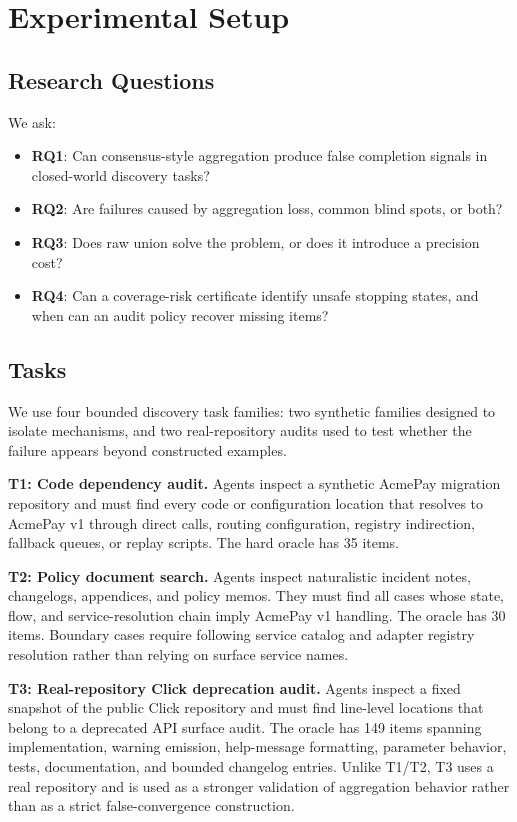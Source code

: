\documentclass[letterpaper]{article}
\begin{document}
\section{Experimental Setup}

\subsection{Research Questions}

We ask:

\begin{itemize}
    \item \textbf{RQ1}: Can consensus-style aggregation produce false completion
    signals in closed-world discovery tasks?
    \item \textbf{RQ2}: Are failures caused by aggregation loss, common blind
    spots, or both?
    \item \textbf{RQ3}: Does raw union solve the problem, or does it introduce a
    precision cost?
    \item \textbf{RQ4}: Can a coverage-risk certificate identify unsafe
    stopping states, and when can an audit policy recover missing items?
\end{itemize}

\subsection{Tasks}

We use four bounded discovery task families: two synthetic families designed to
isolate mechanisms, and two real-repository audits used to test whether the
failure appears beyond constructed examples.

\textbf{T1: Code dependency audit.} Agents inspect a synthetic AcmePay migration
repository and must find every code or configuration location that resolves to
AcmePay v1 through direct calls, routing configuration, registry indirection,
fallback queues, or replay scripts. The hard oracle has 35 items.

\textbf{T2: Policy document search.} Agents inspect naturalistic incident notes,
changelogs, appendices, and policy memos. They must find all cases whose state,
flow, and service-resolution chain imply AcmePay v1 handling. The oracle has 30
items. Boundary cases require following service catalog and adapter registry
resolution rather than relying on surface service names.

\textbf{T3: Real-repository Click deprecation audit.} Agents inspect a fixed
snapshot of the public Click repository and must find line-level locations that
belong to a deprecated API surface audit. The oracle has 149 items spanning
implementation, warning emission, help-message formatting, parameter behavior,
tests, documentation, and bounded changelog entries. Unlike T1/T2, T3 uses a
real repository and is used as a stronger validation of aggregation behavior
rather than as a strict false-convergence construction.
\end{document}
